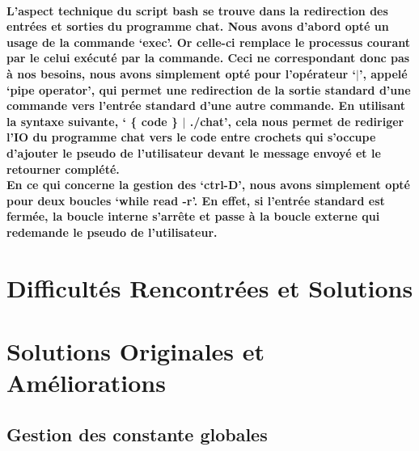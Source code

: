 \documentclass[utf8]{article}
\begin{document}
\paragraph{L'aspect technique du script bash se trouve dans la redirection des entrées et sorties du programme chat. Nous avons d'abord opté un usage de la commande `exec'. Or celle-ci remplace le processus courant
par le celui exécuté par la commande. Ceci ne correspondant donc pas à nos besoins, nous avons simplement opté pour l'opérateur `$|$', appelé `pipe operator', qui permet une redirection de la sortie standard d'une 
commande vers l'entrée standard d'une autre commande. En utilisant la syntaxe suivante, ` \{ code \} $|$ ./chat', cela nous permet de rediriger l'IO du programme chat vers le code entre crochets qui s'occupe
d'ajouter le pseudo de l'utilisateur devant le message envoyé et le retourner complété. \\
En ce qui concerne la gestion des `ctrl-D', nous avons simplement opté pour deux boucles `while read -r'. En effet, si l'entrée standard est fermée, la boucle interne s'arrête et passe à la boucle externe qui
redemande le pseudo de l'utilisateur.} %

\section{Difficultés Rencontrées et Solutions}
\paragraph{}

\section{Solutions Originales et Améliorations}
\subsection{Gestion des constante globales}
\end{document}
